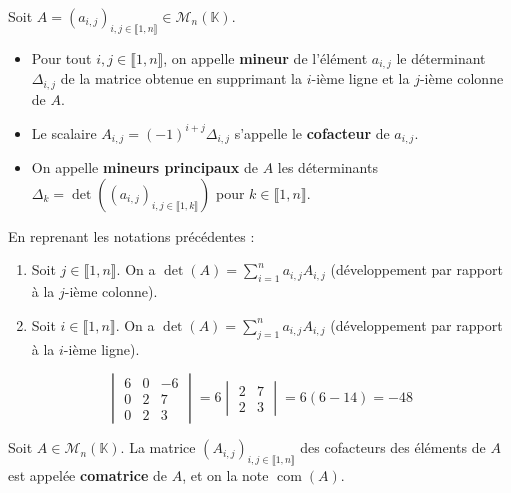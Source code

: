   \begin{definition}
    Soit $A = (a_{i,j})_{i, j \in \llbracket 1, n \rrbracket} \in \mathcal{M}_n(\mathbb{K})$.
    \begin{itemize}
      \item Pour tout $i,j \in \llbracket 1, n \rrbracket$, on appelle \textbf{mineur} de l'élément $a_{i,j}$ le déterminant $\Delta_{i,j}$ de la matrice obtenue en supprimant la $i$-ième ligne et la $j$-ième colonne de $A$.
      \item Le scalaire $A_{i,j} = (-1)^{i+j} \Delta_{i,j}$ s'appelle le \textbf{cofacteur} de $a_{i,j}$.
      \item On appelle \textbf{mineurs principaux} de $A$ les déterminants $\Delta_k = \det((a_{i,j})_{i,j \in \llbracket 1, k \rrbracket})$ pour $k \in \llbracket 1, n \rrbracket$.
    \end{itemize}
  \end{definition}

  \begin{proposition}
    En reprenant les notations précédentes :
    \begin{enumerate}[label={\bfseries(\roman*)}]
      \item Soit $j \in \llbracket 1, n \rrbracket$. On a $\det(A) = \sum_{i=1}^n a_{i,j} A_{i,j}$ (développement par rapport à la $j$-ième colonne).
      \item Soit $i \in \llbracket 1, n \rrbracket$. On a $\det(A) = \sum_{j=1}^n a_{i,j} A_{i,j}$ (développement par rapport à la $i$-ième ligne).
    \end{enumerate}
  \end{proposition}


  \begin{example}
    \[
    \begin{vmatrix}
      6 & 0 & -6 \\
      0 & 2 & 7 \\
      0 & 2 & 3
    \end{vmatrix}
    = 6 \begin{vmatrix}
      2 & 7 \\
      2 & 3
    \end{vmatrix}
    = 6(6-14)
    = -48
    \]
  \end{example}


  \begin{definition}
    Soit $A \in \mathcal{M}_n(\mathbb{K})$. La matrice $(A_{i,j})_{i,j \in \llbracket 1, n \rrbracket}$ des cofacteurs des éléments de $A$ est appelée \textbf{comatrice} de $A$, et on la note $\operatorname{com}(A)$.
  \end{definition}

